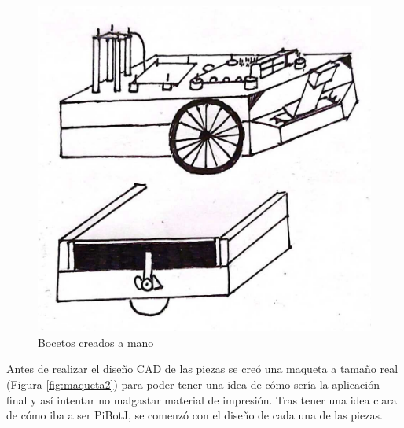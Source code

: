 \begin{figure}[ht!]
\begin{minipage}{0.5\linewidth}
		\centering
		\includegraphics[width=\linewidth]{figs/cap5/boceto_papel.jpeg}
	\end{minipage}
	\caption{Bocetos creados a mano}
	\label{fig:bocetos}
\end{figure}

Antes de realizar el diseño CAD de las piezas se creó una maqueta a tamaño real (Figura \ref{fig:maqueta2}) para poder tener una idea de cómo sería la aplicación final y así intentar no malgastar material de impresión. Tras tener una idea clara de cómo iba a ser PiBotJ, se comenzó con el diseño de cada una de las piezas.  


